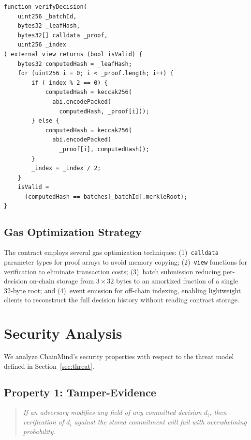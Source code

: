 \documentclass[manuscript,nonacm]{acmart}
\begin{document}
\begin{lstlisting}[caption={On-chain Merkle proof verification},label={lst:verify}]
function verifyDecision(
    uint256 _batchId,
    bytes32 _leafHash,
    bytes32[] calldata _proof,
    uint256 _index
) external view returns (bool isValid) {
    bytes32 computedHash = _leafHash;
    for (uint256 i = 0; i < _proof.length; i++) {
        if (_index % 2 == 0) {
            computedHash = keccak256(
              abi.encodePacked(
                computedHash, _proof[i]));
        } else {
            computedHash = keccak256(
              abi.encodePacked(
                _proof[i], computedHash));
        }
        _index = _index / 2;
    }
    isValid =
      (computedHash == batches[_batchId].merkleRoot);
}
\end{lstlisting}

\subsection{Gas Optimization Strategy}

The contract employs several gas optimization techniques:
(1)~\texttt{calldata} parameter types for proof arrays to avoid memory copying;
(2)~\texttt{view} functions for verification to eliminate transaction costs;
(3)~batch submission reducing per-decision on-chain storage from $3 \times 32$ bytes to an amortized fraction of a single 32-byte root;
and (4)~event emission for off-chain indexing, enabling lightweight clients to reconstruct the full decision history without reading contract storage.


\section{Security Analysis}
\label{sec:security}

We analyze ChainMind's security properties with respect to the threat model defined in Section~\ref{sec:threat}.

\subsection{Property 1: Tamper-Evidence}

\begin{quote}
\emph{If an adversary modifies any field of any committed decision $d_i$, then verification of $d_i$ against the stored commitment will fail with overwhelming probability.}
\end{quote}
\end{document}
